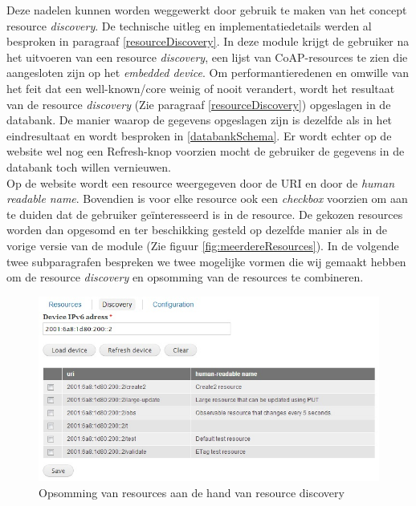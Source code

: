 Deze nadelen kunnen worden weggewerkt door gebruik te maken van het concept resource \textit{discovery}. De technische uitleg en implementatiedetails werden al besproken in paragraaf \ref{resourceDiscovery}. In deze module krijgt de gebruiker na het uitvoeren van een resource \textit{discovery}, een lijst van CoAP-resources te zien die aangesloten zijn op het \textit{embedded device}. Om performantieredenen en omwille van het feit dat een well-known/core weinig of nooit verandert, wordt het resultaat van de resource \textit{discovery} (Zie paragraaf \ref{resourceDiscovery}) opgeslagen in de databank. De manier waarop de gegevens opgeslagen zijn is dezelfde als in het eindresultaat en wordt besproken in \ref{databankSchema}. Er wordt echter op de website wel nog een Refresh-knop voorzien mocht de gebruiker de gegevens in de databank toch willen vernieuwen.\\
Op de website wordt een resource weergegeven door de URI en door de \textit{human readable name}. Bovendien is voor elke resource ook een \textit{checkbox} voorzien om aan te duiden dat de gebruiker ge\"{i}nteresseerd is in de resource. De gekozen resources worden dan opgesomd en ter beschikking gesteld op dezelfde manier als in de vorige versie van de module (Zie figuur \ref{fig:meerdereResources}). In de volgende twee subparagrafen bespreken we twee mogelijke vormen die wij gemaakt hebben om de resource \textit{discovery} en opsomming van de resources te combineren.

\begin{figure}[h!]
\centering
\includegraphics[width=1\textwidth]{fig/tabbladen}
\caption{Opsomming van resources aan de hand van resource discovery}
\label{fig:tabbladen}
\end{figure}

